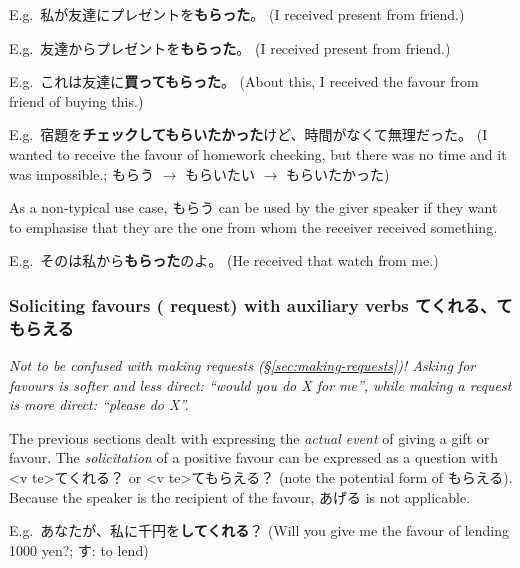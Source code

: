 \documentclass[../nihongo-gakushuu-kyouzai-grammar.tex]{subfiles}
\begin{document}


E.g.\ 私が友達にプレゼントを\textbf{もらった}。 (I received present from friend.)

E.g.\ 友達からプレゼントを\textbf{もらった}。 (I received present from friend.)

E.g.\ これは友達に\textbf{買ってもらった}。 (About this, I received the favour from friend of buying this.)

E.g.\ 宿題を\textbf{チェックしてもらいたかった}けど、時間がなくて無理だった。 (I wanted to receive the favour of homework checking, but there was no time and it was impossible.; もらう $\to$ もらいたい $\to$ もらいたかった)

As a non-typical use case, もらう can be used by the giver speaker if they want to emphasise that they are the one from whom the receiver received something.

E.g.\ そのは私から\textbf{もらった}のよ。 (He received that watch from me.)


\subsubsection{Soliciting favours (\neq{} request) with auxiliary verbs てくれる、てもらえる} \label{sec:soliciting-favours-kureru-moraeru}
\emph{Not to be confused with making requests (\S\ref{sec:making-requests})! Asking for favours is softer and less direct: ``would you do X for me'', while making a request is more direct: ``please do X''.}

The previous sections dealt with expressing the \emph{actual event} of giving a gift or favour. The \emph{solicitation} of a positive favour can be expressed as a question with <v te>てくれる？ or <v te>てもらえる？ (note the potential form of もらえる). Because the speaker is the recipient of the favour, あげる is not applicable.


E.g.\ あなたが、私に千円を\textbf{してくれる}？ (Will you give me the favour of lending 1000 yen?; す: to lend)
\end{document}

